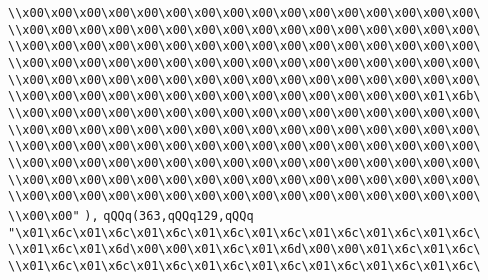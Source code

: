\verb|\\x00\x00\x00\x00\x00\x00\x00\x00\x00\x00\x00\x00\x00\x00\x00\x00\|\newline
\verb|\\x00\x00\x00\x00\x00\x00\x00\x00\x00\x00\x00\x00\x00\x00\x00\x00\|\newline
\verb|\\x00\x00\x00\x00\x00\x00\x00\x00\x00\x00\x00\x00\x00\x00\x00\x00\|\newline
\verb|\\x00\x00\x00\x00\x00\x00\x00\x00\x00\x00\x00\x00\x00\x00\x00\x00\|\newline
\verb|\\x00\x00\x00\x00\x00\x00\x00\x00\x00\x00\x00\x00\x00\x00\x00\x00\|\newline
\verb|\\x00\x00\x00\x00\x00\x00\x00\x00\x00\x00\x00\x00\x00\x00\x01\x6b\|\newline
\verb|\\x00\x00\x00\x00\x00\x00\x00\x00\x00\x00\x00\x00\x00\x00\x00\x00\|\newline
\verb|\\x00\x00\x00\x00\x00\x00\x00\x00\x00\x00\x00\x00\x00\x00\x00\x00\|\newline
\verb|\\x00\x00\x00\x00\x00\x00\x00\x00\x00\x00\x00\x00\x00\x00\x00\x00\|\newline
\verb|\\x00\x00\x00\x00\x00\x00\x00\x00\x00\x00\x00\x00\x00\x00\x00\x00\|\newline
\verb|\\x00\x00\x00\x00\x00\x00\x00\x00\x00\x00\x00\x00\x00\x00\x00\x00\|\newline
\verb|\\x00\x00\x00\x00\x00\x00\x00\x00\x00\x00\x00\x00\x00\x00\x00\x00\|\newline
\verb|\\x00\x00"|\newline
\verb|),|\newline
\verb|qQQq(363,qQQq129,qQQq|\newline
\verb|"\x01\x6c\x01\x6c\x01\x6c\x01\x6c\x01\x6c\x01\x6c\x01\x6c\x01\x6c\|\newline
\verb|\\x01\x6c\x01\x6d\x00\x00\x01\x6c\x01\x6d\x00\x00\x01\x6c\x01\x6c\|\newline
\verb|\\x01\x6c\x01\x6c\x01\x6c\x01\x6c\x01\x6c\x01\x6c\x01\x6c\x01\x6c\|\newline
